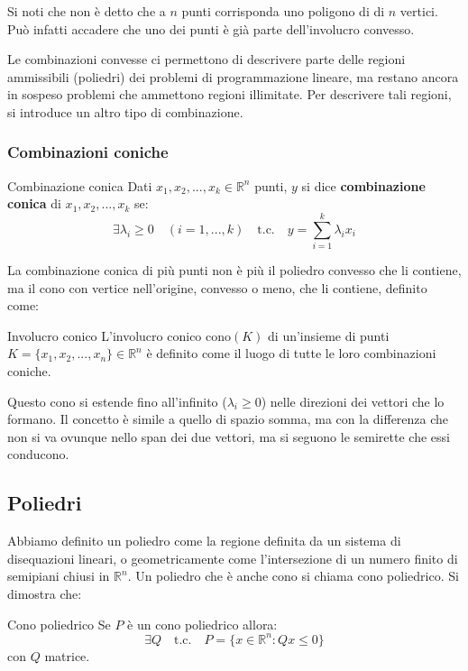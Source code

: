 \documentclass[a4paper,11pt]{article}
\begin{document}
Si noti che non è detto che a $n$ punti corrisponda uno poligono di di $n$ vertici.
Può infatti accadere che uno dei punti è già parte dell'involucro convesso. 

Le combinazioni convesse ci permettono di descrivere parte delle regioni ammissibili (poliedri) dei problemi di programmazione lineare, ma restano ancora in sospeso problemi che ammettono regioni illimitate.
Per descrivere tali regioni, si introduce un altro tipo di combinazione.

\subsubsection{Combinazioni coniche}
\begin{definition}{Combinazione conica}
	Dati $ x_1, x_2, ..., x_k \in \mathbb{R}^n $ punti, $y$ si dice \textbf{combinazione conica} di $ x_1, x_2, ..., x_k $ se:
	$$
	\exists \lambda_i \geq 0 \quad (i = 1, ..., k) \quad \text{t.c.} \quad y = \sum_{i=1}^k \lambda_i x_i 
	$$
\end{definition}

La combinazione conica di più punti non è più il poliedro convesso che li contiene, ma il cono con vertice nell'origine, convesso o meno, che li contiene, definito come:
\begin{definition}{Involucro conico}
	L'involucro conico $\mathrm{cono}(K)$ di un'insieme di punti $K = \{x_1, x_2, ..., x_n\} \in \mathbb{R}^n$ è definito come il luogo di tutte le loro combinazioni coniche.
\end{definition}

Questo cono si estende fino all'infinito ($\lambda_i \geq 0$) nelle direzioni dei vettori che lo formano.
Il concetto è simile a quello di spazio somma, ma con la differenza che non si va ovunque nello span dei due vettori, ma si seguono le semirette che essi conducono.

\subsection{Poliedri}
Abbiamo definito un poliedro come la regione definita da un sistema di disequazioni lineari, o geometricamente come l'intersezione di un numero finito di semipiani chiusi in $\mathbb{R}^n$.
Un poliedro che è anche cono si chiama cono poliedrico. Si dimostra che:
\begin{theorem}{Cono poliedrico}
	Se $P$ è un cono poliedrico allora:
	$$
	\exists Q \quad \text{t.c.} \quad P = \{ x \in \mathbb{R}^n : Qx \leq 0 \}
	$$
	con $Q$ matrice.
\end{theorem}
\end{document}
